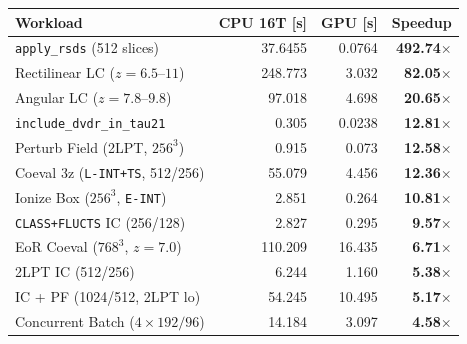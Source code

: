 \begin{tabular}{@{}lrrr@{}}
\toprule
Workload & CPU 16T [s] & GPU [s] & Speedup \\
\midrule
\texttt{apply\_rsds} (512 slices) & 37.6455 & 0.0764 & \textbf{492.74$\times$} \\
Rectilinear LC ($z=6.5\text{--}11$) & 248.773 & 3.032 & \textbf{82.05$\times$} \\
Angular LC ($z=7.8\text{--}9.8$) & 97.018 & 4.698 & \textbf{20.65$\times$} \\
\texttt{include\_dvdr\_in\_tau21} & 0.305 & 0.0238 & \textbf{12.81$\times$} \\
Perturb Field (2LPT, $256^3$) & 0.915 & 0.073 & \textbf{12.58$\times$} \\
Coeval 3z (\texttt{L-INT+TS}, 512/256) & 55.079 & 4.456 & \textbf{12.36$\times$} \\
Ionize Box ($256^3$, \texttt{E-INT}) & 2.851 & 0.264 & \textbf{10.81$\times$} \\
\texttt{CLASS+FLUCTS} IC (256/128) & 2.827 & 0.295 & \textbf{9.57$\times$} \\
EoR Coeval ($768^3$, $z=7.0$) & 110.209 & 16.435 & \textbf{6.71$\times$} \\
2LPT IC (512/256) & 6.244 & 1.160 & \textbf{5.38$\times$} \\
IC + PF (1024/512, 2LPT lo) & 54.245 & 10.495 & \textbf{5.17$\times$} \\
Concurrent Batch ($4\times 192/96$) & 14.184 & 3.097 & \textbf{4.58$\times$} \\
\bottomrule
\end{tabular}
